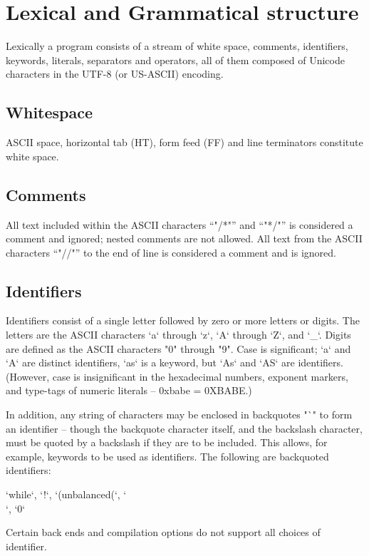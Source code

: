 
\chapter{Lexical and Grammatical structure}


Lexically a program consists of a stream of white space, comments,
identifiers, keywords, literals, separators and operators, all of them
composed of Unicode characters in the UTF-8 (or US-ASCII) encoding. 

\section{Whitespace}
ASCII space, horizontal tab (HT), form feed (FF) and line
terminators constitute white space.

\section{Comments}
All text included within the ASCII characters ``\xcd"/*"'' and
``\xcd"*/"'' is
considered a comment and ignored; nested comments are not
allowed.  All text from the ASCII characters
``\xcd"//"'' to the end of line is considered a comment and is ignored.

\section{Identifiers}

Identifiers consist of a single letter followed by zero or more letters or
digits. The letters are the ASCII characters \xcd`a` through \xcd`z`, \xcd`A`
through \xcd`Z`, and \xcd`_`. Digits are defined as the ASCII characters
\xcd"0" through \xcd"9". Case is significant; \xcd`a` and \xcd`A` are distinct
identifiers, \xcd`as` is a keyword, but \xcd`As` and \xcd`AS` are identifiers.
(However, case is insignificant in the hexadecimal numbers, exponent markers,
and type-tags of numeric literals -- 0xbabe = 0XBABE.)

In addition, any string of characters may be enclosed in backquotes \xcd"`" to
form an identifier -- though the backquote character itself, and the backslash 
character, must be quoted by a backslash if they are to be included.
This allows,
for example, keywords to be used as identifiers.  The following are
backquoted identifiers: 
% 
\begin{xten}
`while`, `!`, `(unbalanced(`,  `\`\\`, `0`
\end{xten}
\noindent
Certain  back ends and compilation options do not support all choices of
identifier.  


